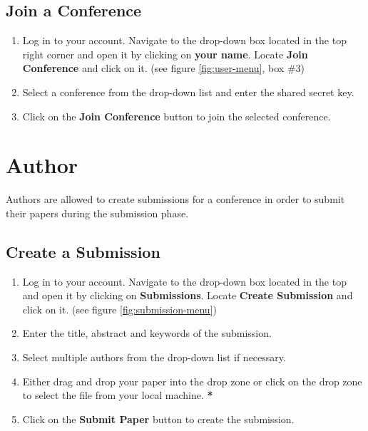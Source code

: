 \documentclass[nochapterpage,nopartpage,noheadingspace,numbersubsubsec,bigchapter,colorback,accentcolor=tud9c,10pt]{tudreport}
\begin{document}
  \section{Join a Conference}
        \begin{enumerate}
            \item   Log in to your account. Navigate to the drop-down box located in the top right corner and open it by clicking on \textbf{your name}. Locate  \textbf{Join Conference} and click on it. (see figure \ref{fig:user-menu}, box \#3)
            \item   Select a conference from the drop-down list and enter the shared secret key.
            \item   Click on the \textbf{Join Conference} button to join the selected conference.
        \end{enumerate}

  \chapter{Author}

    Authors are allowed to create submissions for a conference in order to submit their papers during the submission phase.

  \section{Create a Submission}
        \begin{enumerate}
            \item   Log in to your account. Navigate to the drop-down box located in the top and open it by clicking on \textbf{Submissions}. Locate \textbf{Create Submission} and click on it. (see figure \ref{fig:submission-menu})
            \item   Enter the title, abstract and keywords of the submission.
            \item   Select multiple authors from the drop-down list if necessary.
            \item   Either drag and drop your paper into the drop zone or click on the drop zone to select the file from your local machine. \textbf{*}
            \item   Click on the \textbf{Submit Paper} button to create the submission.
        \end{enumerate}
\end{document}
